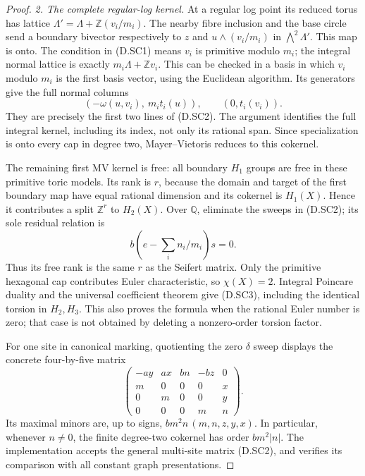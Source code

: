 \begin{proof}
\emph{2. The complete regular-log kernel.}
At a regular log point its reduced torus has lattice
$\Lambda'=\Lambda+\mathbb Z(v_i/m_i)$. The nearby fibre inclusion
and the base circle send a boundary bivector respectively to
$z$ and $u\wedge(v_i/m_i)$ in $\bigwedge^2\Lambda'$.
This map is onto. The condition in (D.SC1) means $v_i$ is primitive
modulo $m_i$; the integral normal lattice is exactly
$m_i\Lambda+\mathbb Z v_i$. This can be checked in a basis in which
$v_i$ modulo $m_i$ is the first basis vector, using the Euclidean
algorithm. Its generators give the full normal columns
\[
 (-\omega(u,v_i),\ m_it_i(u)),\qquad (0,t_i(v_i)).
\]
They are precisely the first two lines of (D.SC2). The argument
identifies the full integral kernel, including its index, not only
its rational span. Since specialization is onto every cap in degree
two, Mayer--Vietoris reduces to this cokernel.

The remaining first MV kernel is free: all boundary $H_1$ groups
are free in these primitive toric models. Its rank is $r$, because
the domain and target of the first boundary map have equal rational
dimension and its cokernel is $H_1(X)$. Hence it contributes a
split $\mathbb Z^r$ to $H_2(X)$. Over $\mathbb Q$, eliminate the
sweeps in (D.SC2); its sole residual relation is
\[
                 b\left(e-\sum_i n_i/m_i\right)s=0.
\]
Thus its free rank is the same $r$ as the Seifert matrix.
Only the primitive hexagonal cap contributes Euler characteristic,
so $\chi(X)=2$. Integral Poincare duality and the universal coefficient
theorem give (D.SC3), including the identical torsion in $H_2,H_3$.
This also proves the formula when the rational Euler number is zero;
that case is not obtained by deleting a nonzero-order torsion factor.

For one site in canonical marking, quotienting the zero $\delta$
sweep displays the concrete four-by-five matrix
\[
 \begin{pmatrix}
 -ay&ax&bn&-bz&0\\
 m&0&0&0&x\\0&m&0&0&y\\0&0&0&m&n
 \end{pmatrix}.                                             \tag{D.SC7}
\]
Its maximal minors are, up to signs,
$bm^2n\,(m,n,z,y,x)$. In particular, whenever $n\ne0$,
the finite degree-two cokernel has order $bm^2|n|$.
The implementation accepts the general multi-site matrix (D.SC2),
and verifies its comparison with all constant graph presentations.


\end{proof}
